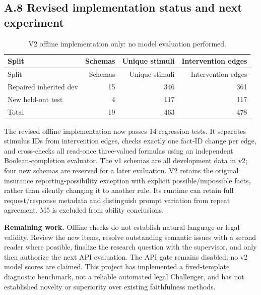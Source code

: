 \subsection*{A.8 Revised implementation status and next experiment}

\begingroup\small\setlength{\tabcolsep}{4pt}
\begin{longtable}{lrrr}
\caption{V2 offline implementation only: no model evaluation performed.}\\
\toprule
Split & Schemas & Unique stimuli & Intervention edges \\
\midrule\endfirsthead
\toprule
Split & Schemas & Unique stimuli & Intervention edges \\
\midrule\endhead
\bottomrule\endfoot
Repaired inherited dev & 15 & 346 & 361 \\
New held-out test & 4 & 117 & 117 \\
Total & 19 & 463 & 478 \\
\end{longtable}\endgroup


The revised offline implementation now passes 14 regression tests. It separates stimulus IDs from intervention edges, checks exactly one fact-ID change per edge, and cross-checks all read-once three-valued formulas using an independent Boolean-completion evaluator. The v1 schemas are all development data in v2; four new schemas are reserved for a later evaluation. V2 retains the original insurance reporting-possibility exception with explicit possible/impossible facts, rather than silently changing it to another rule. Its runtime can retain full request/response metadata and distinguish prompt variation from repeat agreement. M5 is excluded from ability conclusions.

\textbf{Remaining work.} Offline checks do not establish natural-language or legal validity. Review the new items, resolve outstanding semantic issues with a second reader where possible, finalize the research question with the supervisor, and only then authorize the next API evaluation. The API gate remains disabled; no v2 model scores are claimed. This project has implemented a fixed-template diagnostic benchmark, not a reliable automated legal Challenger, and has not established novelty or superiority over existing faithfulness methods.
